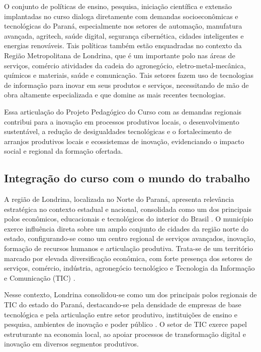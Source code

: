 O conjunto de políticas de ensino, pesquisa, iniciação científica e extensão implantadas no curso dialoga diretamente com demandas socioeconômicas e tecnológicas do Paraná, especialmente nos setores de automação, manufatura avançada, agritech, saúde digital, segurança cibernética, cidades inteligentes e energias renováveis. Tais políticas também estão enquadradas no contexto da Região Metropolitana de Londrina, que é um importante polo nas áreas de serviços, comércio atividades da cadeia do agronegócio, eletro-metal-mecânica, químicos e materiais, saúde e comunicação. Tais setores fazem uso de tecnologias de informação para inovar em seus produtos e serviços, necessitando de mão de obra altamente especializada e que domine as mais recentes tecnologias.

Essa articulação do Projeto Pedagógico do Curso com as demandas regionais contribui para a inovação em processos produtivos locais, o desenvolvimento sustentável, a redução de desigualdades tecnológicas e o fortalecimento de arranjos produtivos locais e ecossistemas de inovação, evidenciando o impacto social e regional da formação ofertada.

\subsection{Integração do curso com o mundo do trabalho}
\label{sec:integracaoMundoDoTrabalho}

A região de Londrina, localizada no Norte do Paraná, apresenta relevância estratégica no contexto estadual e nacional, consolidada como um dos principais polos econômicos, educacionais e tecnológicos do interior do Brasil \cite{Pinto_2022}. O município exerce influência direta sobre um amplo conjunto de cidades da região norte do estado, configurando-se como um centro regional de serviços avançados, inovação, formação de recursos humanos e articulação produtiva. Trata-se de um território marcado por elevada diversificação econômica, com forte presença dos setores de serviços, comércio, indústria, agronegócio tecnológico e Tecnologia da Informação e Comunicação (TIC) \cite{ibgeCensoLondrina2022}.

Nesse contexto, Londrina consolidou-se como um dos principais polos regionais de TIC do estado do Paraná, destacando-se pela densidade de empresas de base tecnológica e pela articulação entre setor produtivo, instituições de ensino e pesquisa, ambientes de inovação e poder público \cite{Abes_2021}. O setor de TIC exerce papel estruturante na economia local, ao apoiar processos de transformação digital e inovação em diversos segmentos produtivos.

